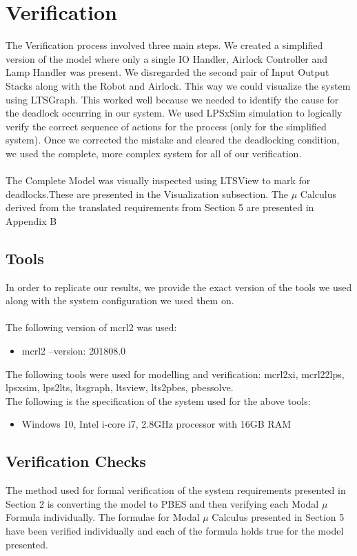 \documentclass[a4paper,12pt]{article}
\begin{document}
\section{Verification}
The Verification process involved three main steps. We created a simplified version of the model where only a single IO Handler, Airlock Controller and Lamp Handler was present. We disregarded the second pair of Input Output Stacks along with the Robot and Airlock. This way we could visualize the system using LTSGraph. This worked well because we needed to identify the cause for the deadlock occurring in our system. We used LPSxSim simulation to logically verify the correct sequence of actions for the process (only for the simplified system). Once we corrected the mistake and cleared the deadlocking condition, we used the complete, more complex system for all of our verification.
\\
\\The Complete Model was visually inspected using LTSView to mark for deadlocks.These are presented in the Visualization subsection. The $\mu$ Calculus derived from the translated requirements from Section 5 are presented in Appendix B 
\subsection{Tools}
In order to replicate our results, we provide the exact version of the tools we used along with the system configuration we used them on.
\\
\\The following version of mcrl2 was used:
\begin{itemize}
    \item mcrl2 --version: 201808.0
\end{itemize}
The following tools were used for modelling and verification: mcrl2xi, mcrl22lps, lpsxsim, lps2lts, ltsgraph, ltsview, lts2pbes, pbessolve.
\\The following is the specification of the system used for the above tools:
\begin{itemize}
    \item Windows 10, Intel i-core i7, 2.8GHz processor with 16GB RAM 
\end{itemize}
\subsection{Verification Checks}
The method used for formal verification of the system requirements presented in Section 2 is converting the model to PBES and then verifying each Modal $\mu$ Formula individually. The formulae for Modal $\mu$ Calculus presented in Section 5 have been verified individually and each of the formula holds true for the model presented.
\end{document}
